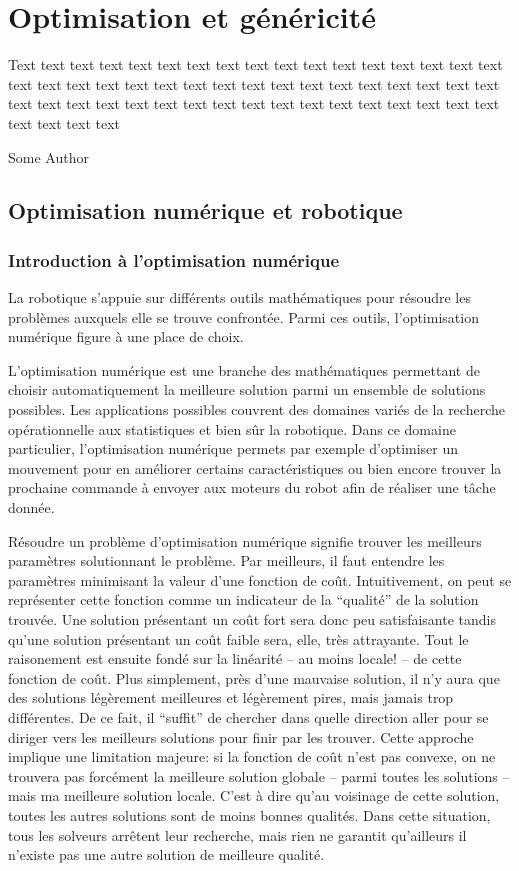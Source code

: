 \chapter[Optimisation]{Optimisation et généricité}
\label{chap:roboptim}

\epigraph{Text text text text text text text text text text text text
  text text text text text text text text text text text text text
  text text text text text text text text text text text text text
  text text text text text text text text text text text text text
  text text text text}{Some Author}
\clearpage

\section[Optimisation]{Optimisation numérique et robotique}

\subsection{Introduction à l'optimisation numérique}

La robotique s'appuie sur différents outils mathématiques pour
résoudre les problèmes auxquels elle se trouve confrontée. Parmi ces
outils, l'optimisation numérique figure à une place de choix.


L'optimisation numérique est une branche des mathématiques permettant
de choisir automatiquement la meilleure solution parmi un ensemble de
solutions possibles. Les applications possibles couvrent des domaines
variés de la recherche opérationnelle aux statistiques et bien sûr la
robotique. Dans ce domaine particulier, l'optimisation numérique
permets par exemple d'optimiser un mouvement pour en améliorer
certains caractéristiques ou bien encore trouver la prochaine commande
à envoyer aux moteurs du robot afin de réaliser une tâche donnée.



Résoudre un problème d'optimisation numérique signifie trouver les
meilleurs paramètres solutionnant le problème. Par meilleurs, il faut
entendre les paramètres minimisant la valeur d'une fonction de
coût. Intuitivement, on peut se représenter cette fonction comme un
indicateur de la ``qualité'' de la solution trouvée. Une solution
présentant un coût fort sera donc peu satisfaisante tandis qu'une
solution présentant un coût faible sera, elle, très attrayante. Tout
le raisonement est ensuite fondé sur la linéarité -- au moins locale!
-- de cette fonction de coût. Plus simplement, près d'une mauvaise
solution, il n'y aura que des solutions légèrement meilleures et
légèrement pires, mais jamais trop différentes. De ce fait, il
``suffit'' de chercher dans quelle direction aller pour se diriger
vers les meilleurs solutions pour finir par les trouver. Cette
approche implique une limitation majeure: si la fonction de coût n'est
pas convexe, on ne trouvera pas forcément la meilleure solution
globale -- parmi toutes les solutions -- mais ma meilleure solution
locale. C'est à dire qu'au voisinage de cette solution, toutes les
autres solutions sont de moins bonnes qualités. Dans cette situation,
tous les solveurs arrêtent leur recherche, mais rien ne garantit
qu'ailleurs il n'existe pas une autre solution de meilleure qualité.


